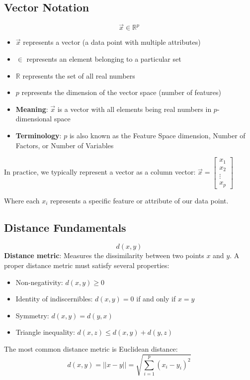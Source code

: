 \documentclass[12pt]{article}
\begin{document}
\subsection{Vector Notation}
\[
\vec{x} \in {\mathbb{R}}^p
\]

\begin{itemize}
    \item $\vec{x}$ represents a vector (a data point with multiple attributes) 
    \item $\in$ represents an element belonging to a particular set 
    \item $\mathbb{R}$ represents the set of all real numbers 
    \item $p$ represents the dimension of the vector space (number of features) 
    \item \textbf{Meaning}: $\vec{x}$ is a vector with all elements being real numbers in $p$-dimensional space
    \item \textbf{Terminology}: $p$ is also known as the Feature Space dimension, Number of Factors, or Number of Variables
\end{itemize}

In practice, we typically represent a vector as a column vector:
$\vec{x} = \begin{bmatrix}
x_1 \\
x_2 \\
\vdots \\
x_p
\end{bmatrix}$ 

Where each $x_i$ represents a specific feature or attribute of our data point.

\subsection{Distance Fundamentals}
\[
    d(x,y)
\]
\textbf{Distance metric}: Measures the dissimilarity between two points $x$ and $y$. A proper distance metric must satisfy several properties:
\begin{itemize}
    \item Non-negativity: $d(x,y) \geq 0$
    \item Identity of indiscernibles: $d(x,y) = 0$ if and only if $x = y$
    \item Symmetry: $d(x,y) = d(y,x)$
    \item Triangle inequality: $d(x,z) \leq d(x,y) + d(y,z)$
\end{itemize}

The most common distance metric is Euclidean distance:
\[
    d(x,y) = ||x-y|| = \sqrt{\sum_{i=1}^{p} (x_i - y_i)^2}
\]
\end{document}
